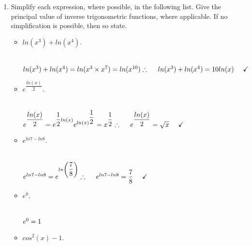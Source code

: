 \documentclass[fleqn]{article}
\begin{document}
  \begin{enumerate}
    \item Simplify each expression, where possible, in the following list. Give the
    principal value of inverse trigonometric functions, where applicable. If no
    simplification is possible, then so state.

    \begin{itemize}
      \item $ln (x^3)+ln (x^4)$.

        \textcolor{hwColor}{
          \\
          $
            ln (x^3)+ln (x^4)=ln(x^3 \times x^7)=ln(x^{10})
            \\
            \\
            \therefore ~~~~ ln (x^3)+ln (x^4)=10 ln(x) ~~~~ \checkmark
            \\
          $
        }

      \item $e^{\dfrac{ln (x)}{2}}$.

        \textcolor{hwColor}{
          \\
          $
            e^{\dfrac{ln (x)}{2}}=e^{\dfrac{1}{2} ln(x)}
            e^{ln(x)^{\dfrac{1}{2}}}=x^{\dfrac{1}{2}}
            \\
            \\
            \\
            \therefore ~~~~ e^{\dfrac{ln (x)}{2}}=\sqrt{x} ~~~~ \checkmark
          $
        }

      \item $e^{ln 7-ln 8}$.

        \textcolor{hwColor}{
          \\
          $
            e^{ln 7-ln 8}=e^{ln\left(\dfrac{7}{8}\right)}
            \\
            \\
            \\
            \therefore ~~~~ e^{ln 7-ln 8}=\dfrac{7}{8} ~~~~ \checkmark
            \\
          $
        }

      \item $e^0$.

        \textcolor{hwColor}{
          \\
          $
            e^0=1
            \\
          $
        }

      \item $cos^{2}(x)-1$.


\end{itemize}
\end{enumerate}
\end{document}
